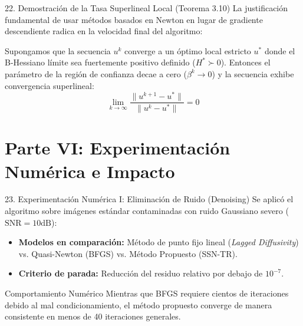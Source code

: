 \documentclass[aspectratio=169,11pt]{beamer}
\begin{document}
\begin{frame}{22. Demostración de la Tasa Superlineal Local (Teorema 3.10)}
    La justificación fundamental de usar métodos basados en Newton en lugar de gradiente descendiente radica en la velocidad final del algoritmo:
    \begin{theorem}
        Supongamos que la secuencia $u^k$ converge a un óptimo local estricto $u^*$ donde el B-Hessiano límite sea fuertemente positivo definido ($H^* \succ 0$). Entonces el parámetro de la región de confianza decae a cero ($\beta^k \to 0$) y la secuencia exhibe convergencia superlineal:
        \begin{equation}
            \lim_{k \to \infty} \frac{\|u^{k+1} - u^*\|}{\|u^k - u^*\|} = 0
        \end{equation}
    \end{theorem}
\end{frame}

\section{Parte VI: Experimentación Numérica e Impacto}

\begin{frame}{23. Experimentación Numérica I: Eliminación de Ruido (Denoising)}
    Se aplicó el algoritmo sobre imágenes estándar contaminadas con ruido Gaussiano severo ($\text{SNR} = 10\text{dB}$):
    \begin{itemize}
        \item \textbf{Modelos en comparación:} Método de punto fijo lineal (\textit{Lagged Diffusivity}) vs. Quasi-Newton (BFGS) vs. Método Propuesto (SSN-TR).
        \item \textbf{Criterio de parada:} Reducción del residuo relativo por debajo de $10^{-7}$.
    \end{itemize}
    \begin{block}{Comportamiento Numérico}
        Mientras que BFGS requiere cientos de iteraciones debido al mal condicionamiento, el método propuesto converge de manera consistente en menos de 40 iteraciones generales.
    \end{block}
\end{frame}
\end{document}
